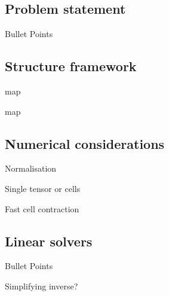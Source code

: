 \documentclass[aspectratio=169]{beamer}
\begin{document}
\subsection{Problem statement}
\begin{frame}{Bullet Points}

\end{frame}

\subsection{Structure framework}
\begin{frame}{map}

\end{frame}

\begin{frame}{map}

\end{frame}

\subsection{Numerical considerations}
\begin{frame}{Normalisation}

\end{frame}

\begin{frame}{Single tensor or cells}

\end{frame}

\begin{frame}{Fast cell contraction}

\end{frame}

\subsection{Linear solvers}
\begin{frame}{Bullet Points}

\end{frame}

\begin{frame}{Simplifying inverse?}

\end{frame}
\end{document}
